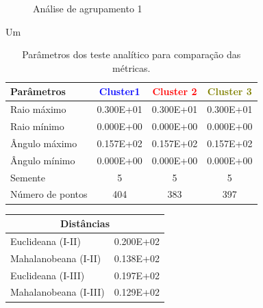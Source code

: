 \begin{figure}[H]
	\centering
	\setlength{\fboxsep}{8pt}
	\setlength{\fboxrule}{0.1pt}
	\caption{Análise de agrupamento 1}
	\label{AC1}
\end{figure}

Um

\begin{table}[H]
	\centering
	\caption{Parâmetros dos teste analítico para comparação das métricas.}
	\label{analise1}
	\begin{tabular}{lccc}
		\hline
		Parâmetros       & \textcolor{blue}{Cluster1} & \textcolor{red}{Cluster 2} & \textcolor{olive}{Cluster 3} \\ \hline
		Raio máximo      & 0.300E+01 & 0.300E+01 & 0.300E+01 \\
		Raio mínimo      & 0.000E+00 & 0.000E+00 & 0.000E+00 \\
		Ângulo máximo    & 0.157E+02 & 0.157E+02 & 0.157E+02 \\
		Ângulo mínimo    & 0.000E+00 & 0.000E+00 & 0.000E+00 \\
		Semente                & 5                 & 5                  & 5         \\
		Número de pontos & 404       & 383       & 397   \\        \hline
	\end{tabular}
\end{table}



 
 \begin{table}[H]
 	\centering
 	\label{metrica1}
 	\begin{tabular}{|l|l|}
 		\hline
 		\multicolumn{2}{|c|}{Distâncias}  \\ \hline
 		Euclideana (I-II)     & 0.200E+02 \\ \hline
 		Mahalanobeana (I-II)  & 0.138E+02 \\ \hline
 		Euclideana (I-III)    & 0.197E+02 \\ \hline
 		Mahalanobeana (I-III) & 0.129E+02 \\ \hline
 	\end{tabular}
 \end{table}


